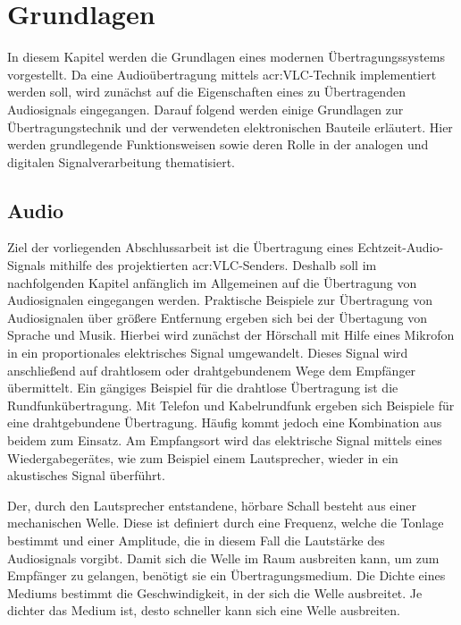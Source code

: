 \chapter{Grundlagen}
\label{chap:fundamentals_related-work}
In diesem Kapitel werden die Grundlagen eines modernen Übertragungssystems vorgestellt. Da eine Audioübertragung mittels \gls{acr:VLC}-Technik implementiert werden soll, wird zunächst auf die Eigenschaften eines zu Übertragenden Audiosignals eingegangen. Darauf folgend werden einige Grundlagen zur Übertragungstechnik und der verwendeten elektronischen Bauteile erläutert. Hier werden grundlegende Funktionsweisen sowie deren Rolle in der analogen und digitalen Signalverarbeitung thematisiert. 

\section{Audio}
\label{subsec:Unterabschnitt1}

Ziel der vorliegenden Abschlussarbeit ist die Übertragung eines Echtzeit-Audio-Signals mithilfe des projektierten \gls{acr:VLC}-Senders. Deshalb soll im nachfolgenden Kapitel anfänglich im Allgemeinen auf die Übertragung von Audiosignalen eingegangen werden. Praktische Beispiele zur Übertragung von Audiosignalen über größere Entfernung ergeben sich bei der Übertagung von Sprache und Musik. Hierbei wird zunächst der Hörschall mit Hilfe eines Mikrofon in ein proportionales elektrisches Signal umgewandelt. Dieses Signal wird anschließend auf drahtlosem oder drahtgebundenem Wege dem Empfänger übermittelt. Ein gängiges Beispiel für die drahtlose Übertragung ist die Rundfunkübertragung. Mit Telefon und Kabelrundfunk ergeben sich Beispiele für eine drahtgebundene Übertragung. Häufig kommt jedoch eine Kombination aus beidem zum Einsatz. Am Empfangsort wird das elektrische Signal mittels eines Wiedergabegerätes, wie zum Beispiel einem Lautsprecher, wieder in ein akustisches Signal überführt.

Der, durch den Lautsprecher entstandene, hörbare Schall besteht aus einer mechanischen Welle. Diese ist definiert durch eine Frequenz, welche die Tonlage bestimmt und einer Amplitude, die in diesem Fall die Lautstärke des Audiosignals vorgibt. Damit sich die Welle im Raum ausbreiten kann, um zum Empfänger zu gelangen, benötigt sie ein Übertragungsmedium. Die Dichte eines Mediums bestimmt die Geschwindigkeit, in der sich die Welle ausbreitet. Je dichter das Medium ist, desto schneller kann sich eine Welle ausbreiten.

